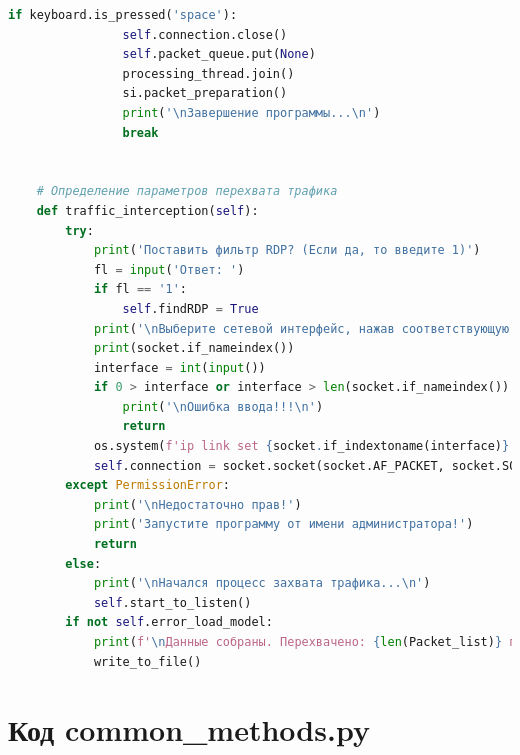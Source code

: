 \documentclass[bachelor, och, coursework]{SCWorks}
\begin{document}
\begin{lstlisting}[language=Python]
            if keyboard.is_pressed('space'):
                self.connection.close()
                self.packet_queue.put(None)
                processing_thread.join()
                si.packet_preparation()
                print('\nЗавершение программы...\n')
                break


    # Определение параметров перехвата трафика
    def traffic_interception(self):
        try:
            print('Поставить фильтр RDP? (Если да, то введите 1)')
            fl = input('Ответ: ')
            if fl == '1':
                self.findRDP = True
            print('\nВыберите сетевой интерфейс, нажав соответствующую цифру:')
            print(socket.if_nameindex())
            interface = int(input())
            if 0 > interface or interface > len(socket.if_nameindex()):
                print('\nОшибка ввода!!!\n')
                return
            os.system(f'ip link set {socket.if_indextoname(interface)} promisc on')
            self.connection = socket.socket(socket.AF_PACKET, socket.SOCK_RAW, socket.ntohs(3))
        except PermissionError:
            print('\nНедостаточно прав!')
            print('Запустите программу от имени администратора!')
            return
        else:
            print('\nНачался процесс захвата трафика...\n')
            self.start_to_listen()
        if not self.error_load_model:
            print(f'\nДанные собраны. Перехвачено: {len(Packet_list)} пакетов(-а)\n')
            write_to_file()
    \end{lstlisting}

    \section{Код common\_methods.py}
    
\end{document}
